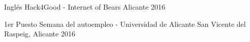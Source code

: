 
\begin{cvhonors}

  \cvhonor
    {Inglés} %
    {Hack4Good - Internet of Bears} %
    {Alicante} %
	{2016} %

  \cvhonor
    {1er Puesto} %
    {Semana del autoempleo - Universidad de Alicante} %
    {San Vicente del Raspeig, Alicante} %
    {2016} %


\end{cvhonors}
